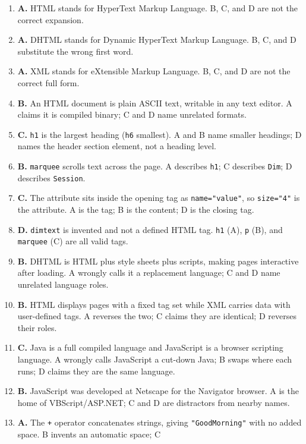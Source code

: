 \begin{enumerate}[label=\textbf{Q\arabic*.}, leftmargin=*]
\item \textbf{A.} HTML stands for HyperText Markup Language. B, C, and D are
  not the correct expansion.
\item \textbf{A.} DHTML stands for Dynamic HyperText Markup Language. B, C,
  and D substitute the wrong first word.
\item \textbf{A.} XML stands for eXtensible Markup Language. B, C, and D are
  not the correct full form.
\item \textbf{B.} An HTML document is plain ASCII text, writable in any text
  editor. A claims it is compiled binary; C and D name unrelated formats.
\item \textbf{C.} \texttt{h1} is the largest heading (\texttt{h6} smallest).
  A and B name smaller headings; D names the header section element, not a
  heading level.
\item \textbf{B.} \texttt{marquee} scrolls text across the page. A describes
  \texttt{h1}; C describes \texttt{Dim}; D describes \texttt{Session}.
\item \textbf{C.} The attribute sits inside the opening tag as
  \texttt{name="value"}, so \texttt{size="4"} is the attribute. A is the tag;
  B is the content; D is the closing tag.
\item \textbf{D.} \texttt{dimtext} is invented and not a defined HTML tag.
  \texttt{h1} (A), \texttt{p} (B), and \texttt{marquee} (C) are all valid tags.
\item \textbf{B.} DHTML is HTML plus style sheets plus scripts, making pages
  interactive after loading. A wrongly calls it a replacement language; C and
  D name unrelated language roles.
\item \textbf{B.} HTML displays pages with a fixed tag set while XML carries
  data with user-defined tags. A reverses the two; C claims they are identical;
  D reverses their roles.
\item \textbf{C.} Java is a full compiled language and JavaScript is a browser
  scripting language. A wrongly calls JavaScript a cut-down Java; B swaps where
  each runs; D claims they are the same language.
\item \textbf{B.} JavaScript was developed at Netscape for the Navigator
  browser. A is the home of VBScript/ASP.NET; C and D are distractors from
  nearby names.
\item \textbf{A.} The \texttt{+} operator concatenates strings, giving
  \texttt{"GoodMorning"} with no added space. B invents an automatic space; C

\end{enumerate}
